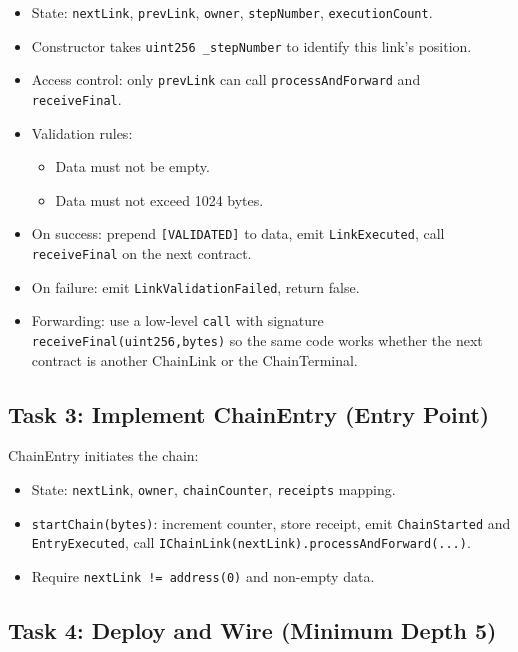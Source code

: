 \documentclass[11pt,a4paper]{article}
\begin{document}
\begin{itemize}
    \item State: \texttt{nextLink}, \texttt{prevLink}, \texttt{owner},
          \texttt{stepNumber}, \texttt{executionCount}.
    \item Constructor takes \texttt{uint256 \_stepNumber} to identify this link's position.
    \item Access control: only \texttt{prevLink} can call \texttt{processAndForward}
          and \texttt{receiveFinal}.
    \item Validation rules:
    \begin{itemize}
        \item Data must not be empty.
        \item Data must not exceed 1024 bytes.
    \end{itemize}
    \item On success: prepend \texttt{[VALIDATED]} to data, emit
          \texttt{LinkExecuted}, call \texttt{receiveFinal} on the next contract.
    \item On failure: emit \texttt{LinkValidationFailed}, return false.
    \item Forwarding: use a low-level \texttt{call} with signature
          \texttt{receiveFinal(uint256,bytes)} so the same code works whether
          the next contract is another ChainLink or the ChainTerminal.
\end{itemize}

\subsection{Task 3: Implement ChainEntry (Entry Point)}

ChainEntry initiates the chain:

\begin{itemize}
    \item State: \texttt{nextLink}, \texttt{owner}, \texttt{chainCounter},
          \texttt{receipts} mapping.
    \item \texttt{startChain(bytes)}: increment counter, store receipt, emit
          \texttt{ChainStarted} and \texttt{EntryExecuted}, call
          \texttt{IChainLink(nextLink).processAndForward(...)}.
    \item Require \texttt{nextLink != address(0)} and non-empty data.
\end{itemize}

\subsection{Task 4: Deploy and Wire (Minimum Depth 5)}
\end{document}
